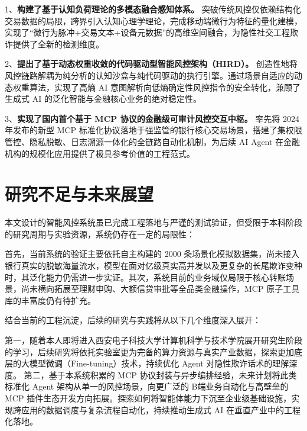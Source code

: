 \documentclass[twoside,openright]{xduugthesis}
\begin{document}
1、\textbf{构建了基于认知负荷理论的多模态融合感知体系。} 突破传统风控仅依赖结构化交易数据的局限，跨界引入认知心理学理论，完成移动端微行为特征的量化建模，实现了“微行为脉冲+交易文本+设备元数据”的高维空间融合，为隐性社交工程欺诈提供了全新的检测维度。

2、\textbf{提出了基于动态权重收敛的代码驱动型智能风控架构（HIRD）。} 创造性地将风控链路解耦为纯分析的认知沙盒与纯代码驱动的执行引擎。通过场景自适应的动态权重算法，实现了高熵 AI 意图解析向低熵确定性风控指令的安全转化，兼顾了生成式 AI 的泛化智能与金融核心业务的绝对稳定性。

3、\textbf{实现了国内首个基于 MCP 协议的金融级可审计风控交互中枢。} 率先将 2024 年发布的新型 MCP 标准化协议落地于强监管的银行核心交易场景，搭建了集权限管控、隐私脱敏、日志溯源一体化的全链路自动化机制，为后续 AI Agent 在金融机构的规模化应用提供了极具参考价值的工程范式。

\section{研究不足与未来展望}

本文设计的智能风控系统虽已完成工程落地与严谨的测试验证，但受限于本科阶段的研究周期与实验资源，系统仍存在一定的局限性：

首先，当前系统的验证主要依托自主构建的 2000 条场景化模拟数据集，尚未接入银行真实的脱敏海量流水，模型在面对亿级真实高并发以及更复杂的长尾欺诈变种时，其泛化能力仍需进一步实证。其次，系统目前的业务域仅局限于核心转账场景，尚未横向拓展至理财申购、大额信贷审批等全品类金融操作，MCP 原子工具库的丰富度仍有待扩充。

结合当前的工程沉淀，后续的研究与实践将从以下几个维度深入展开：

第一，随着本人即将进入西安电子科技大学计算机科学与技术学院展开研究生阶段的学习，后续研究将依托实验室更为完备的算力资源与真实产业数据，探索更加底层的大模型微调（Fine-tuning）技术，持续优化 Agent 对隐性欺诈话术的理解深度。
第二，基于本系统积累的 MCP 协议封装与异步编排经验，未来计划将此类标准化 Agent 架构从单一的风控场景，向更广泛的 B端业务自动化与高壁垒的 MCP 插件生态开发方向拓展。探索如何将智能体能力下沉至企业级基础设施，实现跨应用的数据调度与复杂流程自动化，持续推动生成式 AI 在垂直产业中的工程化落地。
\end{document}
